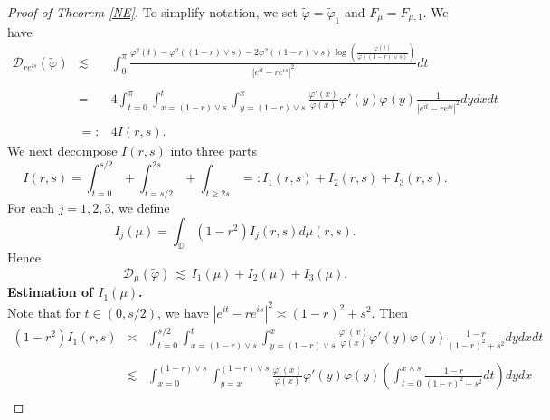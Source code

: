 \documentclass[12pt,reqno,a4paper]{amsart}
\newcommand\DD{\mathbb{D}}
\newcommand{\cD}{{\mathcal{D}}}
\numberwithin{equation}{section}
\begin{document}
\begin{proof}[Proof of Theorem \ref{NE}]
	To simplify notation, we set $\tilde{\varphi} = \tilde{\varphi}_1$ and $F_\mu=F_{\mu,1}$.  We have
	\[
	\begin{array}{lll}
		\cD _{re^{is}}(\tilde{\varphi}) & \lesssim  & \displaystyle \int_0 ^{\pi} \frac{\varphi ^2(t)-\varphi^2((1-r)\vee s)-2\varphi^2((1-r)\vee s)\log \left ( \frac{\varphi (t)}{\varphi((1-r)\vee s)}\right )}{|e^{it}-re^{is}|^2}dt\\
		\\
		& = & 4 \displaystyle \int _{t=0}^{ \pi}  \displaystyle \int _{x=(1-r) \vee s}^t   \displaystyle \int _{y=(1-r)\vee s}^x\frac{\varphi'(x)}{\varphi(x)}\varphi'(y)\varphi(y)\frac{1}{|e^{it}-re^{is}|^2}dydxdt\\
		\\
		&=:  &  4 I(r,s).
	\end{array}
	\]
	We next decompose $I(r,s)$ into three parts
	$$
	I(r,s)= \displaystyle \int _{t=0}^{s/2}+  \displaystyle \int _{t=s/2}^{2s}+  \displaystyle \int _{t\geq 2s}=: I_1(r,s)+I_2(r,s)+I_3(r,s).
	$$
	For each $j=1,2,3$, we define 
	$$
	I_j(\mu)= \displaystyle \int _\DD (1-r^2)I_j(r,s)d\mu(r,s).
	$$
	Hence
	$$
	\cD_{\mu}(\tilde{\varphi})\,\lesssim \, I_1(\mu)+I_2(\mu)+I_3(\mu).
	$$
	{\bf Estimation of $I_1(\mu)$.}\\
	
	\noindent Note that for $t\in (0,s/2)$, we have ${|e^{it}-re^{is}|^2}\asymp (1-r)^2+ s^2$.
	Then 
	\[
	\begin{array}{lll}
		(1-r^2)I_1(r,s) & \asymp & \displaystyle \int _{t=0}^{s/2}  \displaystyle \int _{x=(1-r) \vee s}^t   \displaystyle \int _{y=(1-r)\vee s}^x\frac{\varphi'(x)}{\varphi(x)}\varphi'(y)\varphi(y)\frac{1-r}{(1-r)^2+s^2}dydxdt\\
		\\
		& \lesssim &  \displaystyle \int _{x=0}^{(1-r)\vee s}  \displaystyle \int _{y=x}^{(1-r) \vee s}  \frac{\varphi'(x)}{\varphi(x)}\varphi'(y)\varphi(y)\left (\displaystyle \int _{t=0}^{x\wedge s}\frac{1-r}{(1-r)^2+s^2}dt\right )dydx\\
		

\end{array}\]
\end{proof}
\end{document}
